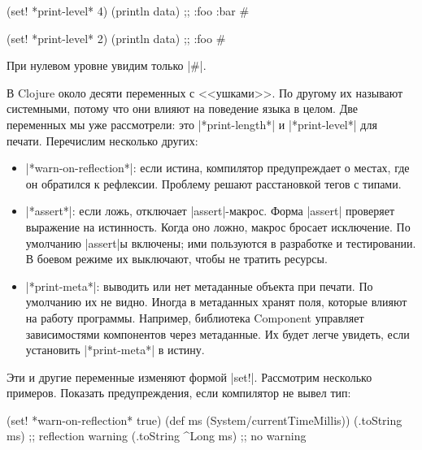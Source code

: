 \begin{english}
  \begin{clojure}
(set! *print-level* 4)
(println data)
;; {:foo {:bar #}}

(set! *print-level* 2)
(println data)
;; {:foo #}
  \end{clojure}
\end{english}

\noindent
При нулевом уровне увидим только \spverb|#|.

В Clojure около десяти переменных с <<ушками>>. По другому их называют
системными, потому что они влияют на поведение языка в целом. Две переменных мы
уже рассмотрели: это \spverb|*print-length*| и \spverb|*print-level*| для
печати. Перечислим несколько других:

\begin{itemize}

\item
  \spverb|*warn-on-reflection*|: если истина, компилятор предупреждает о местах,
  где он обратился к рефлексии. Проблему решают расстановкой тегов с типами.

\item
  \spverb|*assert*|: если ложь, отключает \spverb|assert|-макрос. Форма
  \spverb|assert| проверяет выражение на истинность. Когда оно ложно, макрос
  бросает исключение.  По умолчанию \spverb|assert|ы включены; ими пользуются в
  разработке и тестировании. В боевом режиме их выключают, чтобы не тратить
  ресурсы.

\item
  \spverb|*print-meta*|: выводить или нет метаданные объекта при печати. По
  умолчанию их не видно. Иногда в метаданных хранят поля, которые влияют на
  работу программы. Например, библиотека Component управляет зависимостями
  компонентов через метаданные. Их будет легче увидеть, если установить
  \spverb|*print-meta*| в истину.

\end{itemize}

Эти и другие переменные изменяют формой \spverb|set!|. Рассмотрим несколько
примеров. Показать предупреждения, если компилятор не вывел тип:

\begin{english}
  \begin{clojure}
(set! *warn-on-reflection* true)
(def ms (System/currentTimeMillis))
(.toString ms)       ;; reflection warning
(.toString ^Long ms) ;; no warning
  \end{clojure}
\end{english}

